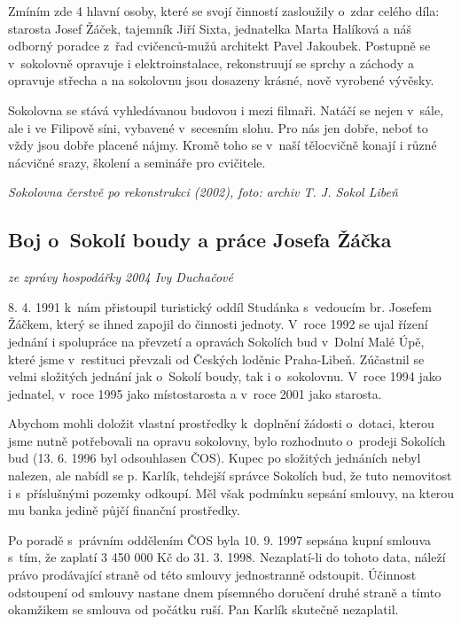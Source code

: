 \documentclass[a5paper, 12pt, twoside]{article}
\begin{document}
Zmíním zde 4 hlavní osoby, které se svojí činností zasloužily o~zdar
celého díla: starosta Josef Žáček, tajemník Jiří Sixta, jednatelka Marta
Halíková a náš odborný poradce z~řad cvičenců-mužů architekt Pavel
Jakoubek. Postupně se v~sokolovně opravuje i elektroinstalace,
rekonstruují se sprchy a záchody a opravuje střecha a na sokolovnu jsou
dosazeny krásné, nově vyrobené vývěsky.

Sokolovna se stává vyhledávanou budovou i mezi filmaři. Natáčí se nejen
v~sále, ale i ve Filipově síni, vybavené v~secesním slohu. Pro nás jen
dobře, neboť to vždy jsou dobře placené nájmy. Kromě toho se v~naší
tělocvičně konají i různé nácvičné srazy, školení a semináře pro
cvičitele.


\textit{Sokolovna čerstvě po rekonstrukci (2002), foto: archiv T. J. Sokol
Libeň}

\subsection{Boj o~Sokolí boudy a práce Josefa
Žáčka}

\textit{ze zprávy hospodářky 2004 Ivy Duchačové}

8. 4. 1991 k~nám přistoupil turistický oddíl Studánka s~vedoucím br.
Josefem Žáčkem, který se ihned zapojil do činnosti jednoty. V~roce 1992
se ujal řízení jednání i spolupráce na převzetí a opravách Sokolích bud
v~Dolní Malé Úpě, které jsme v~restituci převzali od Českých loděnic
Praha-Libeň. Zúčastnil se velmi složitých jednání jak o~Sokolí boudy,
tak i o~sokolovnu. V~roce 1994 jako jednatel, v~roce 1995 jako
místostarosta a v~roce 2001 jako starosta.

Abychom mohli doložit vlastní prostředky k~doplnění žádosti o~dotaci,
kterou jsme nutně potřebovali na opravu sokolovny, bylo rozhodnuto
o~prodeji Sokolích bud (13. 6. 1996 byl odsouhlasen ČOS). Kupec po
složitých jednáních nebyl nalezen, ale nabídl se p. Karlík, tehdejší
správce Sokolích bud, že tuto nemovitost i s~příslušnými pozemky
odkoupí. Měl však podmínku sepsání smlouvy, na kterou mu banka jedině
půjčí finanční prostředky.

Po poradě s~právním oddělením ČOS byla 10. 9. 1997 sepsána kupní smlouva
s~tím, že zaplatí 3 450 000 Kč do 31. 3. 1998. Nezaplatí-li do tohoto
data, náleží právo prodávající straně od této smlouvy jednostranně
odstoupit. Účinnost odstoupení od smlouvy nastane dnem písemného
doručení druhé straně a tímto okamžikem se smlouva od počátku ruší. Pan
Karlík skutečně nezaplatil.
\end{document}
